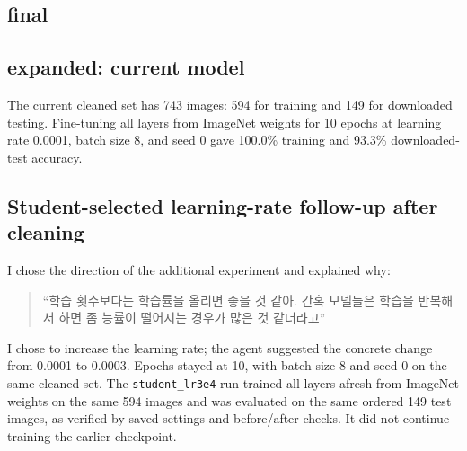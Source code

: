 \documentclass[11pt]{article}
\begin{document}
\subsection*{final}
\par\noindent {}\par
\begin{center}\par\noindent {}\par\end{center}
\par\noindent {}\par
\clearpage
\subsection*{expanded: current model}
The current cleaned set has 743 images: 594 for training and 149 for downloaded testing. Fine-tuning all layers from ImageNet weights for 10 epochs at learning rate 0.0001, batch size 8, and seed 0 gave 100.0\% training and 93.3\% downloaded-test accuracy.
\par\noindent {}\par
\begin{center}\par\noindent {}\par
\end{center}
\par\noindent {}\par
\clearpage
\subsection*{Student-selected learning-rate follow-up after cleaning}
I chose the direction of the additional experiment and explained why:
\begin{quote}
``학습 횟수보다는 학습률을 올리면 좋을 것 같아. 간혹 모델들은 학습을 반복해서 하면 좀 능률이 떨어지는 경우가 많은 것 같더라고''
\end{quote}

I chose to increase the learning rate; the agent suggested the concrete change from 0.0001 to 0.0003. Epochs stayed at 10, with batch size 8 and seed 0 on the same cleaned set. The \texttt{student\_lr3e4} run trained all layers afresh from ImageNet weights on the same 594 images and was evaluated on the same ordered 149 test images, as verified by saved settings and before/after checks. It did not continue training the earlier checkpoint.
\end{document}
